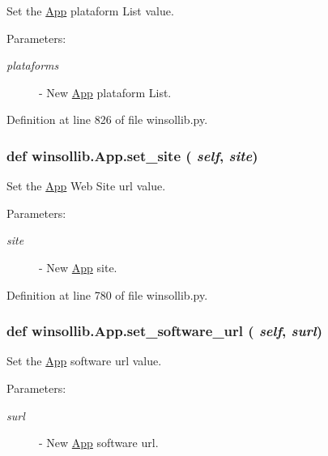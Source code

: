 Set the \hyperlink{classwinsollib_1_1App}{App} plataform List value. 

\begin{Desc}
\item[Parameters:]
\begin{description}
\item[{\em plataforms}]- New \hyperlink{classwinsollib_1_1App}{App} plataform List. \end{description}
\end{Desc}


Definition at line 826 of file winsollib.py.\hypertarget{classwinsollib_1_1App_11788074387939e13d01d0574dccdef6}{
\subsubsection[set\_\-site]{\setlength{\rightskip}{0pt plus 5cm}def winsollib.App.set\_\-site ( {\em self},  {\em site})}}
\label{classwinsollib_1_1App_11788074387939e13d01d0574dccdef6}


Set the \hyperlink{classwinsollib_1_1App}{App} Web Site url value. 

\begin{Desc}
\item[Parameters:]
\begin{description}
\item[{\em site}]- New \hyperlink{classwinsollib_1_1App}{App} site. \end{description}
\end{Desc}


Definition at line 780 of file winsollib.py.\hypertarget{classwinsollib_1_1App_598bc6c69cd3a5f4edeba566ddfda333}{
\subsubsection[set\_\-software\_\-url]{\setlength{\rightskip}{0pt plus 5cm}def winsollib.App.set\_\-software\_\-url ( {\em self},  {\em surl})}}
\label{classwinsollib_1_1App_598bc6c69cd3a5f4edeba566ddfda333}


Set the \hyperlink{classwinsollib_1_1App}{App} software url value. 

\begin{Desc}
\item[Parameters:]
\begin{description}
\item[{\em surl}]- New \hyperlink{classwinsollib_1_1App}{App} software url. \end{description}
\end{Desc}


